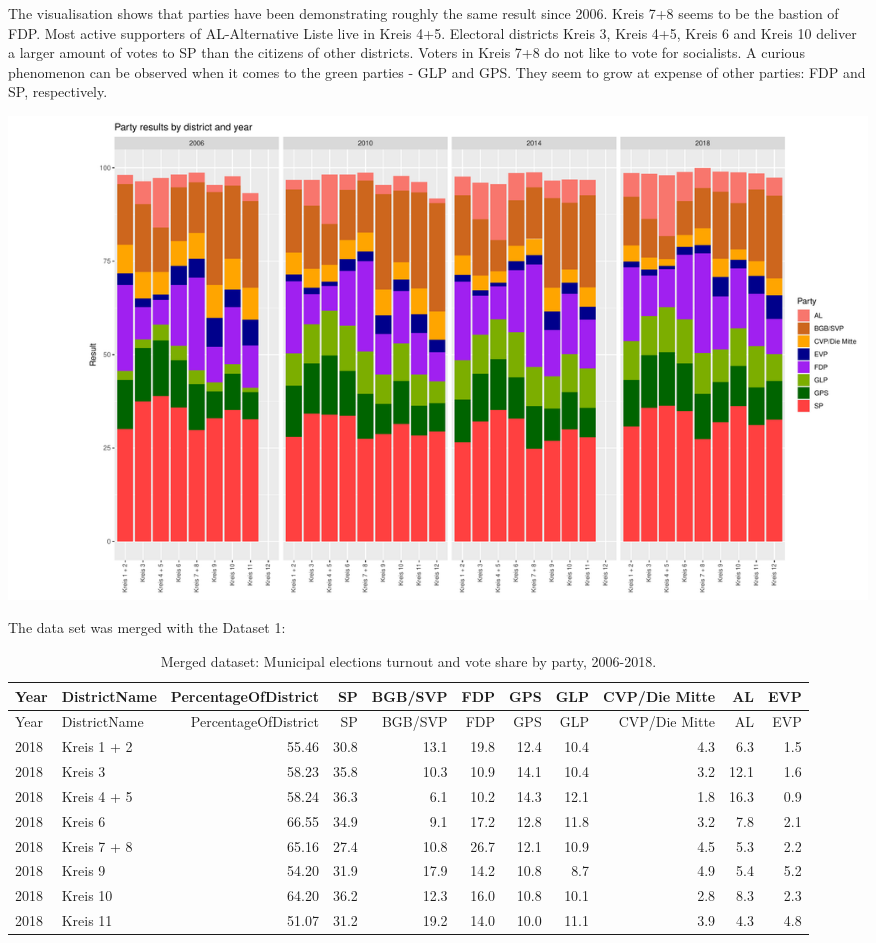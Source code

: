 \documentclass[
]{article}
\begin{document}
The visualisation shows that parties have been demonstrating roughly the
same result since 2006. Kreis 7+8 seems to be the bastion of FDP. Most
active supporters of AL-Alternative Liste live in Kreis 4+5. Electoral
districts Kreis 3, Kreis 4+5, Kreis 6 and Kreis 10 deliver a larger
amount of votes to SP than the citizens of other districts. Voters in
Kreis 7+8 do not like to vote for socialists. A curious phenomenon can
be observed when it comes to the green parties - GLP and GPS. They seem
to grow at expense of other parties: FDP and SP, respectively.

\includegraphics{report_files/figure-latex/plot Parties in Districts-1.pdf}

The data set was merged with the Dataset 1:

\begin{longtable}[]{@{}llrrrrrrrrr@{}}
\caption{Merged dataset: Municipal elections turnout and vote share by
party, 2006-2018.}\tabularnewline
\toprule
Year & DistrictName & PercentageOfDistrict & SP & BGB/SVP & FDP & GPS &
GLP & CVP/Die Mitte & AL & EVP \\
\midrule
\endfirsthead
\toprule
Year & DistrictName & PercentageOfDistrict & SP & BGB/SVP & FDP & GPS &
GLP & CVP/Die Mitte & AL & EVP \\
\midrule
\endhead
2018 & Kreis 1 + 2 & 55.46 & 30.8 & 13.1 & 19.8 & 12.4 & 10.4 & 4.3 &
6.3 & 1.5 \\
2018 & Kreis 3 & 58.23 & 35.8 & 10.3 & 10.9 & 14.1 & 10.4 & 3.2 & 12.1 &
1.6 \\
2018 & Kreis 4 + 5 & 58.24 & 36.3 & 6.1 & 10.2 & 14.3 & 12.1 & 1.8 &
16.3 & 0.9 \\
2018 & Kreis 6 & 66.55 & 34.9 & 9.1 & 17.2 & 12.8 & 11.8 & 3.2 & 7.8 &
2.1 \\
2018 & Kreis 7 + 8 & 65.16 & 27.4 & 10.8 & 26.7 & 12.1 & 10.9 & 4.5 &
5.3 & 2.2 \\
2018 & Kreis 9 & 54.20 & 31.9 & 17.9 & 14.2 & 10.8 & 8.7 & 4.9 & 5.4 &
5.2 \\
2018 & Kreis 10 & 64.20 & 36.2 & 12.3 & 16.0 & 10.8 & 10.1 & 2.8 & 8.3 &
2.3 \\
2018 & Kreis 11 & 51.07 & 31.2 & 19.2 & 14.0 & 10.0 & 11.1 & 3.9 & 4.3 &
4.8 \\
\bottomrule
\end{longtable}
\end{document}
